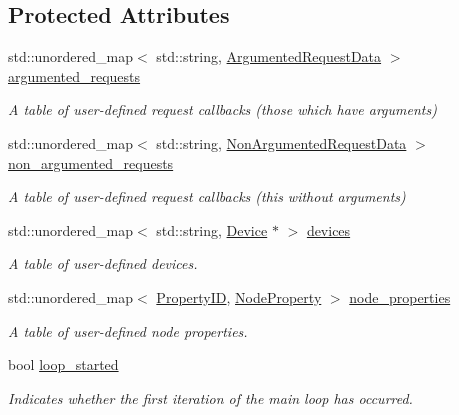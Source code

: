 \subsection*{Protected Attributes}
\begin{DoxyCompactItemize}
\item 
std\+::unordered\+\_\+map$<$ std\+::string, \hyperlink{structcubesat_1_1SimpleAgent_1_1ArgumentedRequestData}{Argumented\+Request\+Data} $>$ \hyperlink{classcubesat_1_1SimpleAgent_abd859978c3143de453a17df044ab4f60}{argumented\+\_\+requests}
\begin{DoxyCompactList}\small\item\em A table of user-\/defined request callbacks (those which have arguments) \end{DoxyCompactList}\item 
std\+::unordered\+\_\+map$<$ std\+::string, \hyperlink{structcubesat_1_1SimpleAgent_1_1NonArgumentedRequestData}{Non\+Argumented\+Request\+Data} $>$ \hyperlink{classcubesat_1_1SimpleAgent_aa8d5ffd8623da8252448b78b8391ee43}{non\+\_\+argumented\+\_\+requests}
\begin{DoxyCompactList}\small\item\em A table of user-\/defined request callbacks (this without arguments) \end{DoxyCompactList}\item 
std\+::unordered\+\_\+map$<$ std\+::string, \hyperlink{classcubesat_1_1Device}{Device} $\ast$ $>$ \hyperlink{classcubesat_1_1SimpleAgent_abe6f03f56926b9159134172b9e031f09}{devices}
\begin{DoxyCompactList}\small\item\em A table of user-\/defined devices. \end{DoxyCompactList}\item 
std\+::unordered\+\_\+map$<$ \hyperlink{namespacecubesat_ab5c769503b8a77bc90a47ca8705f2f86}{Property\+ID}, \hyperlink{structcubesat_1_1SimpleAgent_1_1NodeProperty}{Node\+Property} $>$ \hyperlink{classcubesat_1_1SimpleAgent_afaa70738662df0c6a3d0905a3768321e}{node\+\_\+properties}
\begin{DoxyCompactList}\small\item\em A table of user-\/defined node properties. \end{DoxyCompactList}\item 
bool \hyperlink{classcubesat_1_1SimpleAgent_a016886076c10e7c0ba79df9e524b6636}{loop\+\_\+started}
\begin{DoxyCompactList}\small\item\em Indicates whether the first iteration of the main loop has occurred. \end{DoxyCompactList}\end{DoxyCompactItemize}
